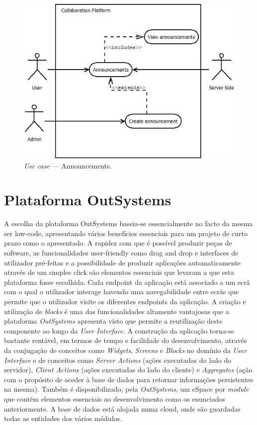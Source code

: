 \begin{figure}[H]
    \centering
    \includegraphics[scale=0.6]{figures/Announcements use case.jpeg}
    \caption{\textit{Use case} --- Announcements.}\label{fig:uc:announcements}
\end{figure}

\section{Plataforma OutSystems}\label{sec:plataformaOutSystems}

A escolha da plataforma OutSystems baseia-se essencialmente no facto da mesma ser low-code,
apresentando vários benefícios essenciais para um projeto de curto prazo como o apresentado. A rapidez
com que é possível produzir peças de software, as funcionalidades user-friendly como drag and drop e 
interfaces de utilizador pré-feitas e a possibilidade de produzir aplicações automaticamente através de
um simples click são elementos essenciais que levaram a que esta plataforma fosse escolhida. 
Cada endpoint da aplicação está associado a um ecrã com o qual o utilizador interage havendo uma navegabilidade entre ecrãs que permite que o utilizador visite os diferentes endpoints da aplicação.
A criação e utilização de \textit{blocks} é uma das funcionalidades altamente vantajosas que a plataforma \textit{OutSystems} apresenta visto que permite a reutilização deste componente ao longo da \textit{User Interface}.
A construção da aplicação torna-se bastante rentável, em termos de tempo e facilidade do desenvolvimento, 
através da conjugação de conceitos como \textit{Widgets}, \textit{Screens} e \textit{Blocks} no domínio da  \textit{User Interface} 
e de conceitos como \textit{Server Actions} (ações executadas do lado do servidor), \textit{Client Actions} (ações executadas do lado do cliente) 
e \textit{Aggregates} (ação com o propósito de aceder à base de dados para retornar informações persistentes na mesma).
Também é disponibilizado, pela \textit{OutSystems}, um eSpace por \textit{module} que contém elementos essenciais ao desenvolvimento como os enunciados anteriormente.
A base de dados está alojada numa cloud, onde são guardadas todas as entidades dos vários módulos.